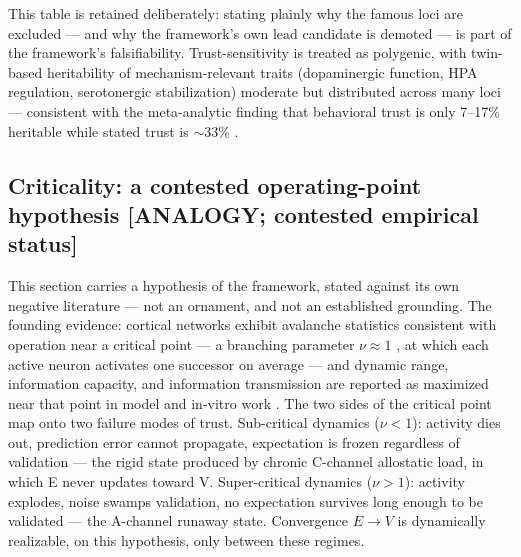 \documentclass[11pt,twocolumn]{article}
\theoremstyle{plain}
\begin{document}
This table is retained deliberately: stating plainly why the famous loci are excluded — and why the framework's own lead candidate is demoted — is part of the framework's falsifiability. Trust-sensitivity is treated as polygenic, with twin-based heritability of mechanism-relevant traits (dopaminergic function, HPA regulation, serotonergic stabilization) moderate but distributed across many loci — consistent with the meta-analytic finding that behavioral trust is only 7–17\% heritable while stated trust is $\sim$33\% \citep{kettlewell2024}.

\subsection{Criticality: a contested operating-point hypothesis [ANALOGY; contested empirical status]}

This section carries a hypothesis of the framework, stated against its own negative literature — not an ornament, and not an established grounding. The founding evidence: cortical networks exhibit avalanche statistics consistent with operation near a critical point — a branching parameter $\nu \approx 1$ , at which each active neuron activates one successor on average \citep{beggs2003} — and dynamic range, information capacity, and information transmission are reported as maximized near that point in model and in-vitro work \citep{kinouchi2006,shew2009,shew2011}. The two sides of the critical point map onto two failure modes of trust. Sub-critical dynamics ($\nu < 1$): activity dies out, prediction error cannot propagate, expectation is frozen regardless of validation — the rigid state produced by chronic C-channel allostatic load, in which E never updates toward V. Super-critical dynamics ($\nu > 1$): activity explodes, noise swamps validation, no expectation survives long enough to be validated — the A-channel runaway state. Convergence $E \to V$ is dynamically realizable, on this hypothesis, only between these regimes.
\end{document}
